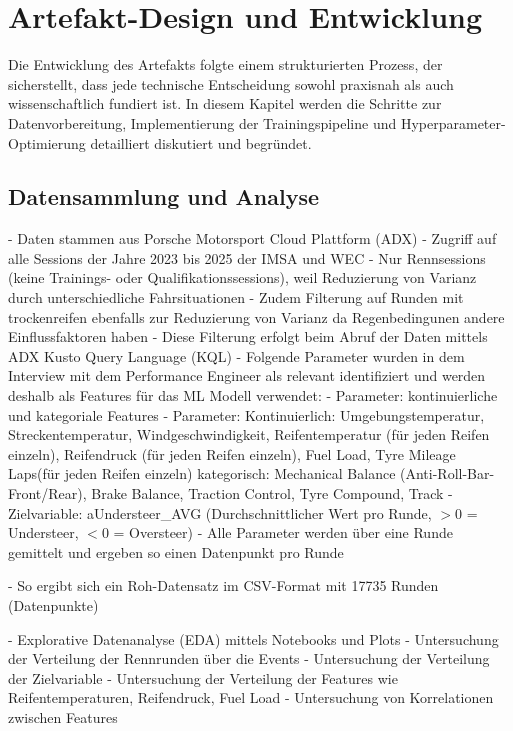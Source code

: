 \chapter{Artefakt-Design und Entwicklung}

Die Entwicklung des Artefakts folgte einem strukturierten Prozess, der sicherstellt, dass jede technische Entscheidung sowohl praxisnah als auch wissenschaftlich fundiert ist. In diesem Kapitel werden die Schritte zur Datenvorbereitung, Implementierung der Trainingspipeline und Hyperparameter-Optimierung detailliert diskutiert und begründet.

\section{Datensammlung und Analyse}

- Daten stammen aus Porsche Motorsport Cloud Plattform (ADX)
- Zugriff auf alle Sessions der Jahre 2023 bis 2025 der IMSA und WEC 
- Nur Rennsessions (keine Trainings- oder Qualifikationssessions), weil Reduzierung von Varianz durch unterschiedliche Fahrsituationen
- Zudem Filterung auf Runden mit trockenreifen ebenfalls zur Reduzierung von Varianz da Regenbedingunen andere Einflussfaktoren haben
- Diese Filterung erfolgt beim Abruf der Daten mittels ADX Kusto Query Language (KQL)
- Folgende Parameter wurden in dem Interview mit dem Performance Engineer als relevant identifiziert und werden deshalb als Features für das ML Modell verwendet:
- Parameter: kontinuierliche und kategoriale Features
- Parameter: 
Kontinuierlich: Umgebungstemperatur, Streckentemperatur, Windgeschwindigkeit, Reifentemperatur (für jeden Reifen einzeln), Reifendruck (für jeden Reifen einzeln), Fuel Load, Tyre Mileage Laps(für jeden Reifen einzeln)
kategorisch: Mechanical Balance (Anti-Roll-Bar-Front/Rear), Brake Balance, Traction Control, Tyre Compound, Track
- Zielvariable: aUndersteer\_AVG (Durchschnittlicher Wert pro Runde, $>0$ = Understeer, $<0$ = Oversteer)
- Alle Parameter werden über eine Runde gemittelt und ergeben so einen Datenpunkt pro Runde


- So ergibt sich ein Roh-Datensatz im CSV-Format mit 17735 Runden (Datenpunkte) 

- Explorative Datenanalyse (EDA) mittels Notebooks und Plots 
- Untersuchung der Verteilung der Rennrunden über die Events
- Untersuchung der Verteilung der Zielvariable
- Untersuchung der Verteilung der Features wie Reifentemperaturen, Reifendruck, Fuel Load
- Untersuchung von Korrelationen zwischen Features





